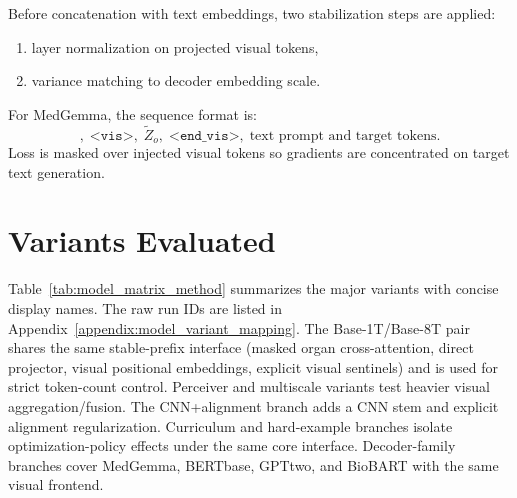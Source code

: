 Before concatenation with text embeddings, two stabilization steps are applied:
\begin{enumerate}
    \item layer normalization on projected visual tokens,
    \item variance matching to decoder embedding scale.
\end{enumerate}

For MedGemma, the sequence format is:
\begin{equation}
[\text{BOS}],\;\texttt{<vis>},\;\tilde{Z}_o,\;\texttt{<end\_vis>},\;\text{text prompt and target tokens}.
\end{equation}
Loss is masked over injected visual tokens so gradients are concentrated on target text generation.

\section{Variants Evaluated}\label{sec:method_variants}
Table~\ref{tab:model_matrix_method} summarizes the major variants with concise display names. The raw run IDs are listed in Appendix~\ref{appendix:model_variant_mapping}. The Base-1T/Base-8T pair shares the same stable-prefix interface (masked organ cross-attention, direct projector, visual positional embeddings, explicit visual sentinels) and is used for strict token-count control. Perceiver and multiscale variants test heavier visual aggregation/fusion. The CNN+alignment branch adds a CNN stem and explicit alignment regularization. Curriculum and hard-example branches isolate optimization-policy effects under the same core interface. Decoder-family branches cover MedGemma, \ac{BERTbase}, \ac{GPTtwo}, and BioBART with the same visual frontend.

